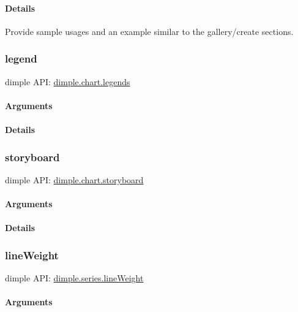 \documentclass[letterpaper,10pt,english]{sphinxmanual}
\begin{document}
\paragraph{Details}
\label{dimple/api:details}
Provide sample usages and an example similar to the gallery/create sections.


\subsubsection{legend}
\label{dimple/api:legend}
dimple API: \href{https://github.com/PMSI-AlignAlytics/dimple/wiki/dimple.chart\#legends}{dimple.chart.legends}


\paragraph{Arguments}
\label{dimple/api:id4}

\paragraph{Details}
\label{dimple/api:id5}

\subsubsection{storyboard}
\label{dimple/api:storyboard}
dimple API: \href{https://github.com/PMSI-AlignAlytics/dimple/wiki/dimple.chart\#storyboard}{dimple.chart.storyboard}


\paragraph{Arguments}
\label{dimple/api:id6}

\paragraph{Details}
\label{dimple/api:id7}

\subsubsection{lineWeight}
\label{dimple/api:lineweight}
dimple API: \href{https://github.com/PMSI-AlignAlytics/dimple/wiki/dimple.series\#lineWeight}{dimple.series.lineWeight}


\paragraph{Arguments}
\label{dimple/api:id8}
\end{document}
